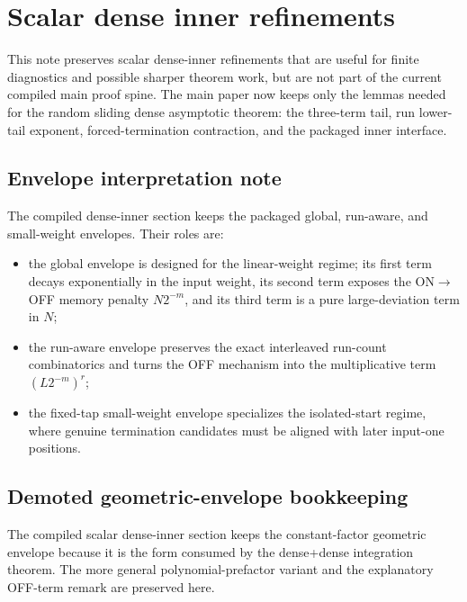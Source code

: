 \section{Scalar dense inner refinements}
\label{sec:scalar-dense-inner-refinements}

This note preserves scalar dense-inner refinements that are useful for finite diagnostics and possible sharper theorem
work, but are not part of the current compiled main proof spine. The main paper now keeps only the lemmas needed for the
random sliding dense asymptotic theorem: the three-term tail, run lower-tail exponent, forced-termination contraction,
and the packaged inner interface.

\subsection{Envelope interpretation note}

The compiled dense-inner section keeps the packaged global, run-aware, and
small-weight envelopes.  Their roles are:
\begin{itemize}
\item the global envelope is designed for the linear-weight regime; its first
term decays exponentially in the input weight, its second term exposes the
ON\(\to\)OFF memory penalty \(N2^{-m}\), and its third term is a pure
large-deviation term in \(N\);
\item the run-aware envelope preserves the exact interleaved run-count
combinatorics and turns the OFF mechanism into the multiplicative term
\((L2^{-m})^r\);
\item the fixed-tap small-weight envelope specializes the isolated-start regime,
where genuine termination candidates must be aligned with later input-one
positions.
\end{itemize}

\subsection{Demoted geometric-envelope bookkeeping}

The compiled scalar dense-inner section keeps the constant-factor geometric envelope because it is the form consumed by
the dense+dense integration theorem.  The more general polynomial-prefactor variant and the explanatory OFF-term remark
are preserved here.

